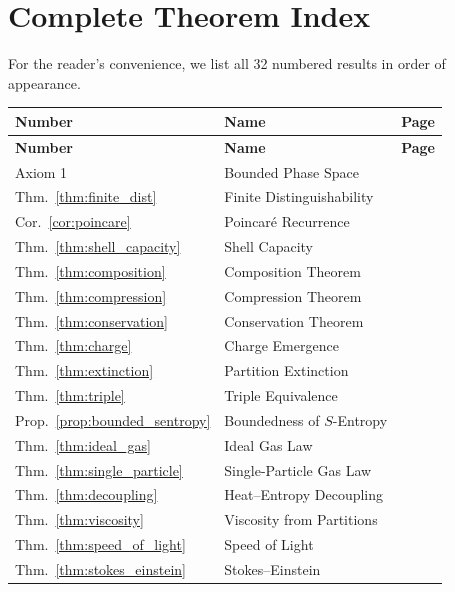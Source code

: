 \documentclass[11pt,twocolumn,a4paper]{article}
\theoremstyle{plain}
\theoremstyle{definition}
\theoremstyle{remark}
\begin{document}
\section{Complete Theorem Index}
\label{app:theorems}

For the reader's convenience, we list all 32 numbered results in order of appearance.

\begin{longtable}{lll}
\toprule
\textbf{Number} & \textbf{Name} & \textbf{Page} \\
\midrule
\endfirsthead
\toprule
\textbf{Number} & \textbf{Name} & \textbf{Page} \\
\midrule
\endhead
Axiom 1 & Bounded Phase Space & \pageref{ax:bounded} \\
Thm.~\ref{thm:finite_dist} & Finite Distinguishability & \pageref{thm:finite_dist} \\
Cor.~\ref{cor:poincare} & Poincar\'e Recurrence & \pageref{cor:poincare} \\
Thm.~\ref{thm:shell_capacity} & Shell Capacity & \pageref{thm:shell_capacity} \\
Thm.~\ref{thm:composition} & Composition Theorem & \pageref{thm:composition} \\
Thm.~\ref{thm:compression} & Compression Theorem & \pageref{thm:compression} \\
Thm.~\ref{thm:conservation} & Conservation Theorem & \pageref{thm:conservation} \\
Thm.~\ref{thm:charge} & Charge Emergence & \pageref{thm:charge} \\
Thm.~\ref{thm:extinction} & Partition Extinction & \pageref{thm:extinction} \\
Thm.~\ref{thm:triple} & Triple Equivalence & \pageref{thm:triple} \\
Prop.~\ref{prop:bounded_sentropy} & Boundedness of $S$-Entropy & \pageref{prop:bounded_sentropy} \\
Thm.~\ref{thm:ideal_gas} & Ideal Gas Law & \pageref{thm:ideal_gas} \\
Thm.~\ref{thm:single_particle} & Single-Particle Gas Law & \pageref{thm:single_particle} \\
Thm.~\ref{thm:decoupling} & Heat--Entropy Decoupling & \pageref{thm:decoupling} \\
Thm.~\ref{thm:viscosity} & Viscosity from Partitions & \pageref{thm:viscosity} \\
Thm.~\ref{thm:speed_of_light} & Speed of Light & \pageref{thm:speed_of_light} \\
Thm.~\ref{thm:stokes_einstein} & Stokes--Einstein & \pageref{thm:stokes_einstein} \\

\end{longtable}
\end{document}
